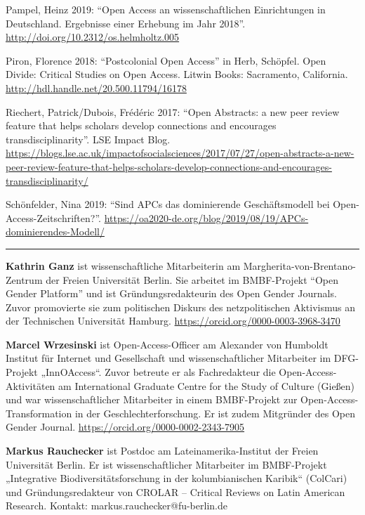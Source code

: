 \documentclass[a4paper,
fontsize=11pt,
oneside,
numbers=noperiodatend,
parskip=half-,
bibliography=totoc,
final
]{scrartcl}
\begin{document}
Pampel, Heinz 2019: \enquote{Open Access an wissenschaftlichen
Einrichtungen in Deutschland. Ergebnisse einer Erhebung im Jahr 2018}.
\url{http://doi.org/10.2312/os.helmholtz.005}

Piron, Florence 2018: \enquote{Postcolonial Open Access} in Herb,
Schöpfel. Open Divide: Critical Studies on Open Access. Litwin Books:
Sacramento, California. \url{http://hdl.handle.net/20.500.11794/16178}

Riechert, Patrick/Dubois, Frédéric 2017: \enquote{Open Abstracts: a new
peer review feature that helps scholars develop connections and
encourages transdisciplinarity}. LSE Impact Blog.
\url{https://blogs.lse.ac.uk/impactofsocialsciences/2017/07/27/open-abstracts-a-new-peer-review-feature-that-helps-scholars-develop-connections-and-encourages-transdisciplinarity/}

Schönfelder, Nina 2019: \enquote{Sind APCs das dominierende
Geschäftsmodell bei Open-Access-Zeit\-schriften?}.
\url{https://oa2020-de.org/blog/2019/08/19/APCs-dominierendes-Modell/}

\begin{center}\rule{0.5\linewidth}{\linethickness}\end{center}

\textbf{Kathrin Ganz} ist wissenschaftliche Mitarbeiterin am
Margherita-von-Brentano-Zentrum der Freien Universität Berlin. Sie
arbeitet im BMBF-Projekt \enquote{Open Gender Platform} und ist
Gründungsredakteurin des Open Gender Journals. Zuvor promovierte sie zum
politischen Diskurs des netzpolitischen Aktivismus an der Technischen
Universität Hamburg. \url{https://orcid.org/0000-0003-3968-3470}

\textbf{Marcel Wrzesinski} ist Open-Access-Officer am Alexander von
Humboldt Institut für Internet und Gesellschaft und wissenschaftlicher
Mitarbeiter im DFG-Projekt „InnOAccess``. Zuvor betreute er als
Fachredakteur die Open-Access-Aktivitäten am International Graduate
Centre for the Study of Culture (Gießen) und war wissenschaftlicher
Mitarbeiter in einem BMBF-Projekt zur Open-Access-Transformation in der
Geschlechterforschung. Er ist zudem Mitgründer des Open Gender Journal.
\url{https://orcid.org/0000-0002-2343-7905}

\textbf{Markus Rauchecker} ist Postdoc am Lateinamerika-Institut der
Freien Universität Berlin. Er ist wissenschaftlicher Mitarbeiter im
BMBF-Projekt „Integrative Biodiversitätsforschung in der kolumbianischen
Karibik`` (ColCari) und Gründungsredakteur von CROLAR -- Critical
Reviews on Latin American Research. Kontakt:
markus.rauchecker@fu-berlin.de
\end{document}
